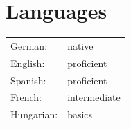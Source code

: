 \documentclass[11pt]{article}
\begin{document}



	\section*{Languages}
	\begin{tabularx}{\textwidth}{sX}
		German: & native \\
		English: & proficient \\
		Spanish: & proficient \\
		French: & intermediate \\
		Hungarian: & basics 
	\end{tabularx}
	
\end{document}
